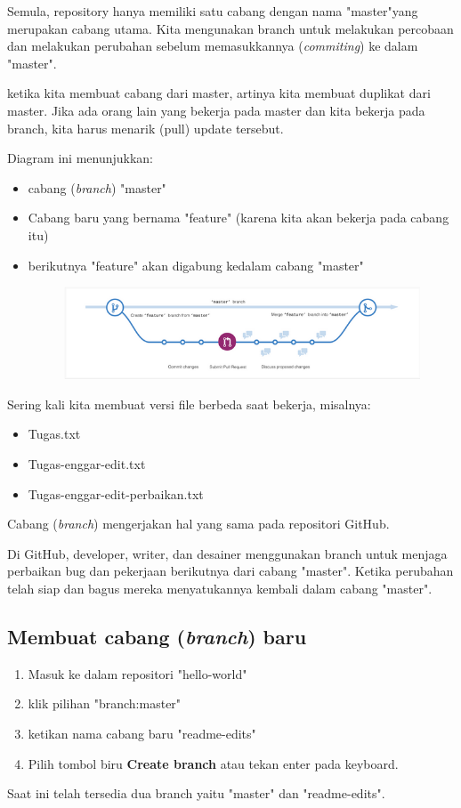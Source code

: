 \documentclass[12pt,a4paper]{article}
\begin{document}
Semula, repository hanya memiliki satu cabang dengan nama "master"yang merupakan cabang utama. Kita mengunakan branch untuk melakukan percobaan dan melakukan perubahan sebelum memasukkannya (\textit{commiting}) ke dalam "master". 

ketika kita membuat cabang dari master, artinya kita membuat duplikat dari master. Jika ada orang lain yang bekerja pada master dan kita bekerja pada branch, kita harus menarik (pull) update tersebut.

Diagram ini menunjukkan:
\begin{itemize}
\item cabang (\textit{branch}) "master"
\item Cabang baru yang bernama "feature" (karena kita akan bekerja pada cabang itu)
\item berikutnya "feature" akan digabung kedalam cabang "master"
\begin{figure}[h!]
\includegraphics[scale=0.5]{image/branch.png} 
\end{figure}
\end{itemize} 

Sering kali kita membuat versi file berbeda saat bekerja, misalnya:
\begin{itemize}
\item Tugas.txt
\item Tugas-enggar-edit.txt
\item Tugas-enggar-edit-perbaikan.txt
\end{itemize}

Cabang (\textit{branch}) mengerjakan hal yang sama pada repositori GitHub.

Di GitHub, developer, writer, dan desainer menggunakan branch untuk menjaga perbaikan bug dan pekerjaan berikutnya dari cabang "master". Ketika perubahan telah siap dan bagus mereka menyatukannya kembali dalam cabang "master".

\subsection*{Membuat cabang (\textit{branch}) baru}
\begin{enumerate}
\item Masuk ke dalam repositori "hello-world"
\item klik pilihan "branch:master"
\item ketikan nama cabang baru "readme-edits"
\item Pilih tombol biru \textbf{Create branch} atau tekan enter pada keyboard.
\end{enumerate}   
Saat ini telah tersedia dua branch yaitu "master" dan "readme-edits".
\end{document}
